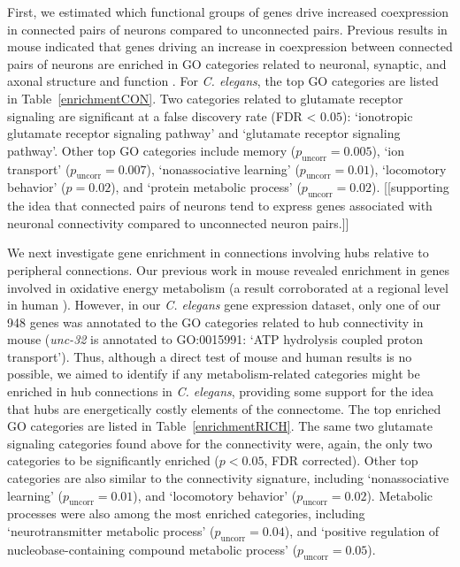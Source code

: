 \documentclass[10pt,letterpaper]{article}
\begin{document}
First, we estimated which functional groups of genes drive increased coexpression in connected pairs of neurons compared to unconnected pairs.
Previous results in mouse indicated that genes driving an increase in coexpression between connected pairs of neurons are enriched in GO categories related to neuronal, synaptic, and axonal structure and function
\cite{Fulcher:2016ck, Ji:2014jw, Fakhry:2015kl, French:2011cz}.
For \emph{C. elegans}, the top GO categories are listed in Table~\ref{enrichmentCON}.
Two categories related to glutamate receptor signaling are significant at a false discovery rate (FDR < $0.05$): `ionotropic glutamate receptor signaling pathway' and `glutamate receptor signaling pathway'.
Other top GO categories include memory ($p_\mathrm{uncorr} = 0.005$), `ion transport' ($p_\mathrm{uncorr} = 0.007$), `nonassociative learning' ($p_\mathrm{uncorr} = 0.01$), `locomotory behavior' ($p = 0.02$), and `protein metabolic process' ($p_\mathrm{uncorr} = 0.02$).
[[supporting the idea that connected pairs of neurons tend to express genes associated with neuronal connectivity compared to unconnected neuron pairs.]]

We next investigate gene enrichment in connections involving hubs relative to peripheral connections.
Our previous work in mouse revealed enrichment in genes involved in oxidative energy metabolism \cite{Fulcher:2016ck} (a result corroborated at a regional level in human \cite{Vertes2016a}).
However, in our \emph{C. elegans} gene expression dataset, only one of our 948 genes was annotated to the GO categories related to hub connectivity in mouse (\emph{unc-32} is annotated to GO:0015991: `ATP hydrolysis coupled proton transport').
Thus, although a direct test of mouse and human results is no possible, we aimed to identify if any metabolism-related categories might be enriched in hub connections in \emph{C. elegans}, providing some support for the idea that hubs are energetically costly elements of the connectome.
The top enriched GO categories are listed in Table~\ref{enrichmentRICH}.
The same two glutamate signaling categories found above for the connectivity were, again, the only two categories to be significantly enriched ($p<0.05$, FDR corrected).
Other top categories are also similar to the connectivity signature, including `nonassociative learning' ($p_\mathrm{uncorr} = 0.01$), and `locomotory behavior' ($p_\mathrm{uncorr} = 0.02$).
Metabolic processes were also among the most enriched categories, including `neurotransmitter metabolic process' ($p_\mathrm{uncorr} = 0.04$), and `positive regulation of nucleobase-containing compound metabolic process' ($p_\mathrm{uncorr} = 0.05$).
\end{document}
